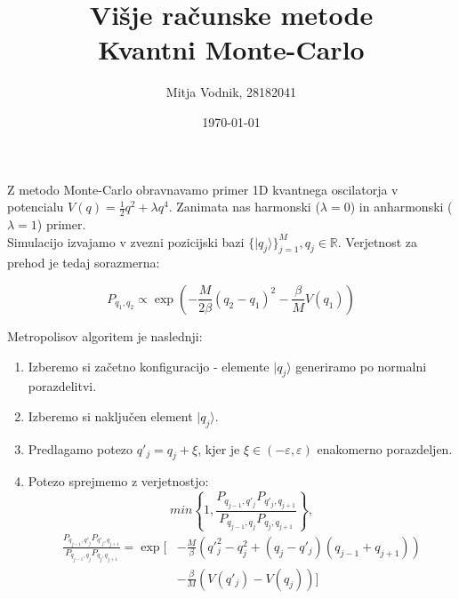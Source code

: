 \documentclass[a4paper]{article}
\newcommand{\half}{\frac{1}{2}}
\newcommand{\ket}[1]{|#1\rangle}
\begin{document}
    \title{\sc\large Višje računske metode\\
		\bigskip
		\bf\Large Kvantni Monte-Carlo}
	\author{Mitja Vodnik, 28182041}
	\date{\today}
	\maketitle

    Z metodo Monte-Carlo obravnavamo primer 1D kvantnega oscilatorja v potencialu $V(q) = \half q^2 + \lambda q^4$.
    Zanimata nas harmonski ($\lambda = 0$) in anharmonski ($\lambda = 1$) primer. \\

    Simulacijo izvajamo v zvezni pozicijski bazi $\{ \ket{q_j} \}_{j=1}^M, q_j \in \mathbb{R}$.
    Verjetnost za prehod je tedaj sorazmerna:

    \begin{equation}\label{eq1}
        P_{q_1, q_2} \propto \exp \left( -\frac{M}{2\beta}(q_2 - q_1)^2 - \frac{\beta}{M}V(q_1) \right)
    \end{equation}

    Metropolisov algoritem je naslednji:

    \begin{enumerate}
        \item Izberemo si začetno konfiguracijo - elemente $\ket{q_j}$ generiramo po normalni porazdelitvi.
        \item Izberemo si naključen element $\ket{q_j}$.
        \item Predlagamo potezo $q'_j = q_j + \xi$, kjer je $\xi \in (-\varepsilon, \varepsilon)$ enakomerno porazdeljen.
        \item Potezo sprejmemo z verjetnostjo:
        \begin{equation}\label{eq2}
            min \left\{ 1, \frac{P_{q_{j-1}, q'_j} P_{q'_j, q_{j+1}}}{P_{q_{j-1}, q_j} P_{q_j, q_{j+1}}} \right\},
        \end{equation}
        \begin{equation}\label{eq3}
            \begin{split}
                \frac{P_{q_{j-1}, q'_j} P_{q'_j, q_{j+1}}}{P_{q_{j-1}, q_j} P_{q_j, q_{j+1}}} =
                \exp \biggl[ &-\frac{M}{\beta}\left(q'_j^2 - q_j^2 + (q_j - q'_j)(q_{j-1} + q_{j+1})\right) \\
                            &- \frac{\beta}{M}\left(V(q'_j) - V(q_j)\right) \biggr]
            \end{split}
        \end{equation}
    \end{enumerate}
\end{document}
